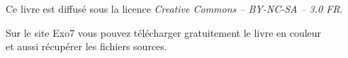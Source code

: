 \vspace*{\fill}


\begin{center}
Ce livre est diffusé sous la licence \emph{Creative Commons -- BY-NC-SA -- 3.0 FR}.


Sur le site Exo7 vous pouvez télécharger gratuitement le livre en couleur\\
et aussi récupérer les fichiers sources.

\end{center}





